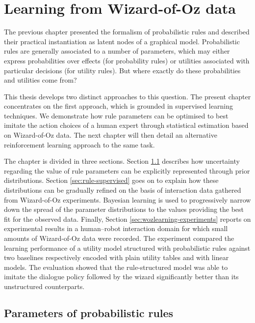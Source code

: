 
\chapter{Learning from Wizard-of-Oz data}
\label{chap:wozlearning}

The previous chapter presented the formalism of probabilistic rules and described their practical instantiation as latent nodes of a graphical model. Probabilistic rules are generally associated to a number of parameters, which may either express probabilities over effects (for probability rules) or utilities associated with particular decisions (for utility rules). But where exactly do these probabilities and utilities come from?

This thesis develops two distinct approaches to this question. The present chapter concentrates on the first approach, which is grounded in supervised learning techniques. We demonstrate how rule parameters can be optimised to best imitate the action choices of a human expert through statistical estimation based on Wizard-of-Oz data. The next chapter will then detail an alternative reinforcement learning approach to the same task.

The chapter is divided in three sections.  Section \ref{sec:rule-params} describes how uncertainty regarding the value of rule parameters can be explicitly represented through prior distributions. Section \ref{sec:rule-supervised} goes on to explain how these distributions can be gradually refined on the basis of interaction data gathered from Wizard-of-Oz experiments.  Bayesian learning  is used to progressively narrow down the spread of the parameter distributions to the values providing the best fit for the observed data. Finally, Section \ref{sec:wozlearning-experiments} reports on experimental results in a human--robot interaction domain for which small amounts of Wizard-of-Oz data were recorded. The experiment compared the learning performance of a utility model structured with probabilistic rules against two baselines respectively encoded with plain utility tables and with linear models. The evaluation showed that the rule-structured model was able to imitate the dialogue policy followed by the wizard significantly better than its unstructured counterparts.

\section{Parameters of probabilistic rules}
\label{sec:rule-params}

